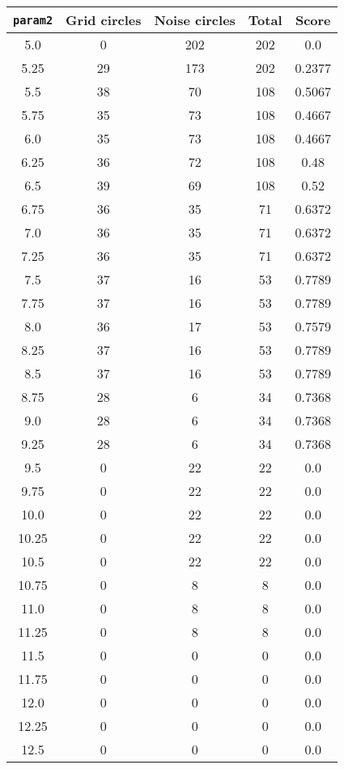 \documentclass[letterpaper, 12pt]{article}
\begin{document}
\begin{longtable}{|c|c|c|c|c|}
\hline
\textbf{\texttt{param2}} & \textbf{Grid circles} & \textbf{Noise circles} & \textbf{Total} & \textbf{Score} \\
\hline
5.0 & 0 & 202 & 202 & 0.0 \\
\hline
5.25 & 29 & 173 & 202 & 0.2377 \\
\hline
5.5 & 38 & 70 & 108 & 0.5067 \\
\hline
5.75 & 35 & 73 & 108 & 0.4667 \\
\hline
6.0 & 35 & 73 & 108 & 0.4667 \\
\hline
6.25 & 36 & 72 & 108 & 0.48 \\
\hline
6.5 & 39 & 69 & 108 & 0.52 \\
\hline
6.75 & 36 & 35 & 71 & 0.6372 \\
\hline
7.0 & 36 & 35 & 71 & 0.6372 \\
\hline
7.25 & 36 & 35 & 71 & 0.6372 \\
\hline
7.5 & 37 & 16 & 53 & 0.7789 \\
\hline
7.75 & 37 & 16 & 53 & 0.7789 \\
\hline
8.0 & 36 & 17 & 53 & 0.7579 \\
\hline
8.25 & 37 & 16 & 53 & 0.7789 \\
\hline
8.5 & 37 & 16 & 53 & 0.7789 \\
\hline
8.75 & 28 & 6 & 34 & 0.7368 \\
\hline
9.0 & 28 & 6 & 34 & 0.7368 \\
\hline
9.25 & 28 & 6 & 34 & 0.7368 \\
\hline
9.5 & 0 & 22 & 22 & 0.0 \\
\hline
9.75 & 0 & 22 & 22 & 0.0 \\
\hline
10.0 & 0 & 22 & 22 & 0.0 \\
\hline
10.25 & 0 & 22 & 22 & 0.0 \\
\hline
10.5 & 0 & 22 & 22 & 0.0 \\
\hline
10.75 & 0 & 8 & 8 & 0.0 \\
\hline
11.0 & 0 & 8 & 8 & 0.0 \\
\hline
11.25 & 0 & 8 & 8 & 0.0 \\
\hline
11.5 & 0 & 0 & 0 & 0.0 \\
\hline
11.75 & 0 & 0 & 0 & 0.0 \\
\hline
12.0 & 0 & 0 & 0 & 0.0 \\
\hline
12.25 & 0 & 0 & 0 & 0.0 \\
\hline
12.5 & 0 & 0 & 0 & 0.0 \\

\end{longtable}
\end{document}
